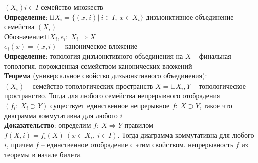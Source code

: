 	$(X_i) i\in I$-семейство множеств\\
	\textbf{Определение}: $\sqcup X_i = \{(x,i)|\ i\in I,\ x\in X_i\}$-дизъюнктивное объединение семейства $(X_i)$\\
	Обозначение:$\sqcup X_i, e_i:\ X_i \Rightarrow X$\\
	$e_i (x) = (x,i)$ -- каноническое вложение\\
	\textbf{Определение}: топология дизъюнктивного объединения на $X$ -- финальная топология, порожденная семейством канонических вложений\\
	\textbf{Теорема} (универсальное свойство дизъюнктивного объединения):\\
	$(X_i)$ -- семейство топологических пространств $X = \sqcup X_i, Y$ -- топологическое пространство. Тогда для любого семейства непрерывного отобрадения $(f_i:\ X_i \supset Y)$ существует единственное непрерывное $f:\ X\supset Y$, такое что диаграмма коммутативна для любого $i$\\
	\textbf{Доказательство}: определим $f:\ X \Rightarrow Y$ правилом $f(X, i) = f_i (X)\ (x\in X_i,\ i\in I)$. Тогда диаграмма коммутативна для любого $i$, причем $f$ -- единственное отобрадение с этим свойством. непрерывность $f$ из теоремы в начале билета.\\
	\begin{figure}[h]
	\end{figure}

\newpage
